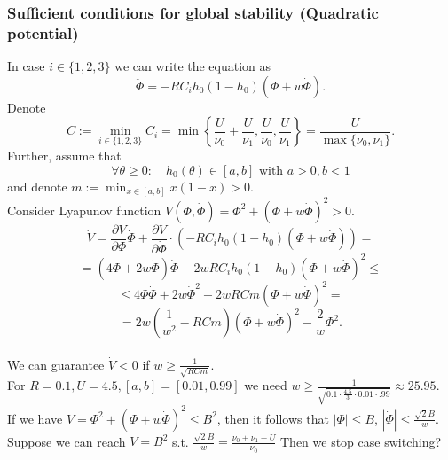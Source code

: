 \documentclass[12pt]{article}
\begin{document}
\subsubsection*{Sufficient conditions for global stability (Quadratic potential)}
In case $i \in \{ 1, 2, 3 \}$ we can write the equation as
$$ \ddot{\Phi} = - RC_i h_0(1-h_0)(\Phi + w \dot{\Phi}).$$ 
Denote 
$$ C := \min_{i \in \{ 1, 2, 3 \}} C_i = \min \left\{  \frac{U}{\nu_0} + \frac{U}{\nu_1} , \frac{U}{\nu_0} , \frac{U}{\nu_1} \right\} = \frac{ U}{\max \{ \nu_0, \nu_1 \}}.$$
Further, assume that
 $$ \forall \theta \geq 0: \quad h_0(\theta) \in [a, b] \text{ with } a > 0, b < 1$$
  and denote  $m := \min_{x \in [a,b]} x(1-x) > 0 $.
\\
Consider Lyapunov function $V(\Phi, \dot{\Phi}) = \Phi^2 + (\Phi + w \dot{\Phi}) ^2 >0 $.
$$ \dot{V} = \frac{\partial V}{\partial \Phi} \dot{\Phi} + \frac{\partial V}{\partial \dot{\Phi}} \cdot \left( -RC_i  h_0(1-h_0)(\Phi + w \dot{\Phi}) \right)  = $$
$$ = \left( 4\Phi + 2w\dot{\Phi} \right)\dot{\Phi}  - 2w R C_i h_0(1-h_0)(\Phi + w \dot{\Phi})^2 \leq $$
$$ \leq  4\Phi\dot{\Phi} + 2w\dot{\Phi}^2 - 2wRCm (\Phi + w \dot{\Phi})^2 = $$
$$ = 2w \left( \frac{1}{w^2} - RCm \right)  (\Phi + w \dot{\Phi})^2 - \frac{2}{w} \Phi^2  .$$
\\
We can guarantee $\dot{V} < 0$ if $w \geq \frac{1}{\sqrt{RCm}}$.
\\
For $R = 0.1, U = 4.5, [a,b] = [0.01, 0.99]$ we need $w \geq \frac{1}{\sqrt{ 0.1 \cdot \frac{ 4.5}{3} \cdot 0.01 \cdot .99}} \approx 25.95 $.
\\
If we have $V = \Phi^2 + (\Phi + w\dot{\Phi})^2 \leq B^2$, then it follows that $ |\Phi| \leq B $, $ | \dot{\Phi} | \leq \frac{\sqrt{2}B}{w} $.  
\\
Suppose we can reach $V = B^2$ s.t. $\frac{\sqrt{2}B}{w} = \frac{\nu_0 + \nu_1 - U}{\nu_0} $ 
Then we stop case switching?
%
%
%
\end{document}
